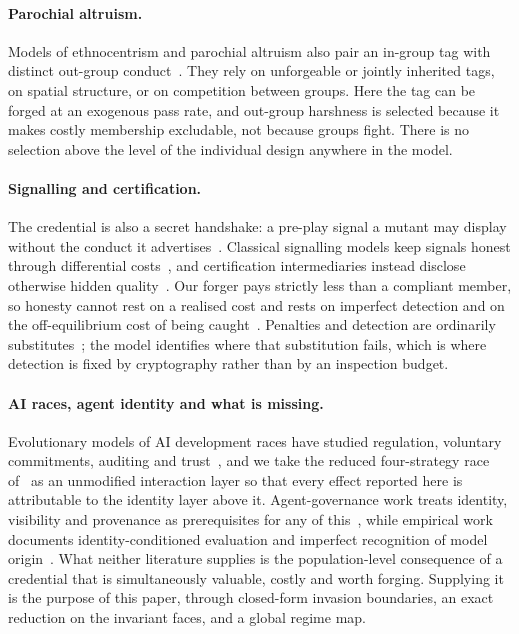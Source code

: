 \documentclass[preprint,12pt]{elsarticle}
\theoremstyle{plain}
\theoremstyle{definition}
\begin{document}
\paragraph{Parochial altruism.}
Models of ethnocentrism and parochial altruism also pair an in-group tag with
distinct out-group conduct~\citep{hammond2006ethnocentrism,choi2007parochial}.
They rely on unforgeable or jointly inherited tags, on spatial structure, or on
competition between groups. Here the tag can be forged at an exogenous pass
rate, and out-group harshness is selected because it makes costly membership
excludable, not because groups fight. There is no selection above the level of
the individual design anywhere in the model.

\paragraph{Signalling and certification.}
The credential is also a secret handshake: a pre-play signal a mutant may
display without the conduct it advertises~\citep{robson1990efficiency}.
Classical signalling models keep signals honest through differential
costs~\citep{grafen1990biological,spence1973job}, and certification
intermediaries instead disclose otherwise hidden
quality~\citep{dranove2010quality,leland1979quacks}. Our forger pays strictly
less than a compliant member, so honesty cannot rest on a realised cost and
rests on imperfect detection and on the off-equilibrium cost of being
caught~\citep{szamado2011cost}. Penalties and detection are ordinarily
substitutes~\citep{becker1968crime}; the model identifies where that
substitution fails, which is where detection is fixed by cryptography rather
than by an inspection budget.

\paragraph{AI races, agent identity and what is missing.}
Evolutionary models of AI development races have studied regulation, voluntary
commitments, auditing and
trust~\citep{han2020regulate,han2022voluntary,bova2024vigilant}, and we take the
reduced four-strategy race of~\citet{domingos2026falling} as an unmodified
interaction layer so that every effect reported here is attributable to the
identity layer above it. Agent-governance work treats identity, visibility and
provenance as prerequisites for any of
this~\citep{chan2024visibility,chan2025infrastructure,otsuka2026aiidentity,kolt2025governing},
while empirical work documents identity-conditioned evaluation and imperfect
recognition of model
origin~\citep{panickssery2024llm,sun2025idiosyncrasies,wang2026outgroup}. What
neither literature supplies is the population-level consequence of a credential
that is simultaneously valuable, costly and worth forging. Supplying it is the
purpose of this paper, through closed-form invasion boundaries, an exact
reduction on the invariant faces, and a global regime map.
\end{document}
